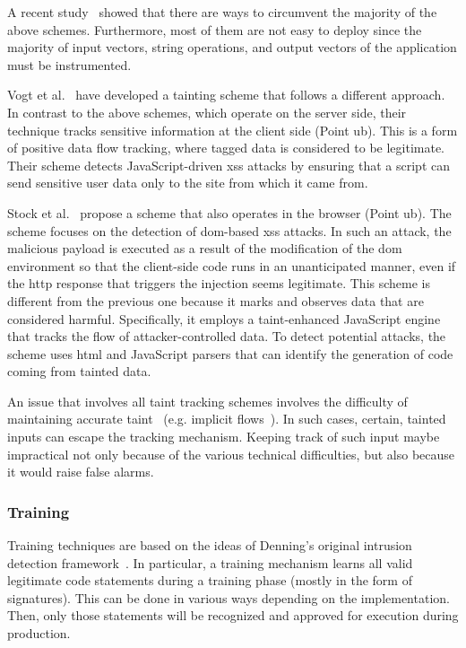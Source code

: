 \documentclass[10pt,journal,compsoc]{IEEEtran}
\begin{document}
A recent study~\cite{NBR14} showed that there are ways to circumvent
the majority of the above schemes. Furthermore, most of them are not
easy to deploy since the majority of input vectors, string operations,
and output vectors of the application must be instrumented.

Vogt et al.~\cite{VFJKKV07} have developed a tainting scheme
that follows a different approach. In contrast to the above
schemes, which operate on the server side, their technique tracks sensitive
information at the client side (Point {\sc ub}). This is a form of
positive data flow tracking, where tagged data is considered to be
legitimate. Their scheme detects JavaScript-driven {\sc xss} attacks
by ensuring that a script can send sensitive user data only to the
site from which it came from.

Stock et al.~\cite{SLMS14} propose a scheme that also operates
in the browser (Point {\sc ub}). The scheme focuses on the detection of
{\sc dom}-based {\sc xss} attacks. In such an attack, the malicious
payload is executed as a result of the modification of the {\sc dom}
environment so that the client-side code runs in an unanticipated
manner, even if the {\sc http} response that triggers the injection
seems legitimate. This scheme is different from the previous one
because it marks and observes data that are considered harmful.
Specifically, it employs a taint-enhanced JavaScript engine that
tracks the flow of attacker-controlled data. To detect potential
attacks, the scheme uses {\sc html} and JavaScript parsers that can
identify the generation of code coming from tainted data.

An issue that involves all taint tracking schemes involves
the difficulty of maintaining accurate taint~\cite{GMPS11}
(e.g. implicit flows~\cite{ME07}).
In such cases, certain, tainted inputs can escape the tracking mechanism.
Keeping track of such input maybe impractical not only because of the
various technical difficulties, but also because it would raise false alarms.

\subsubsection{Training}
\label{sec:train}

Training techniques are based on the ideas of Denning's original
intrusion detection framework~\cite{Den87}. In particular, a training
mechanism learns all valid legitimate code statements during a
training phase (mostly in the form of signatures). This can be done in
various ways depending on the implementation. Then, only those
statements will be recognized and approved for execution during
production.
\end{document}
